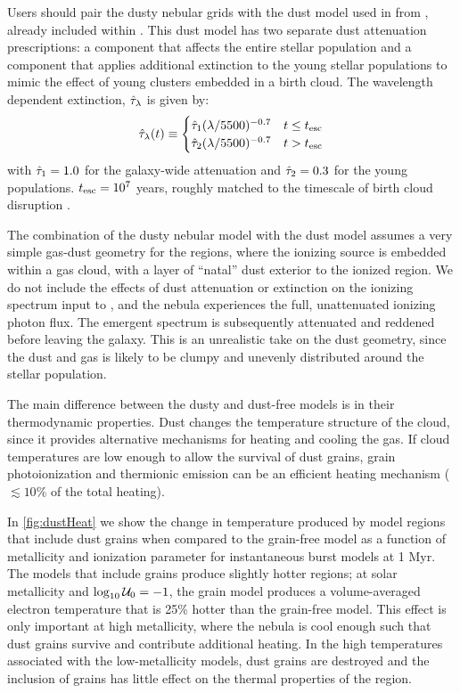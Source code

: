 Users should pair the dusty nebular grids with the dust model used in \citet{Conroy09} from \citet{CharlotFall}, already included within \FSPS. This dust model has two separate dust attenuation prescriptions: a component that affects the entire stellar population and a component that applies additional extinction to the young stellar populations to mimic the effect of young clusters embedded in a birth cloud. The wavelength dependent extinction, $\hat{\tau}_{\mathrm{\lambda}}$ is given by:
\begin{displaymath}\label{eq:dust}
\hat{\tau}_{\mathrm{\lambda}}(t) \equiv \begin{cases}
\hat{\tau}_{\mathrm{1}}(\lambda/5500)^{-0.7} & t \leq t_{\mathrm{esc}} \\
\hat{\tau}_{\mathrm{2}}(\lambda/5500)^{-0.7} & t > t_{\mathrm{esc}}\end{cases}
\end{displaymath}
with $\hat{\tau}_{\mathrm{1}} = 1.0$ for the galaxy-wide attenuation and $\hat{\tau}_{\mathrm{2}} = 0.3$ for the young populations. $t_{\mathrm{esc}} = 10^7$ years, roughly matched to the timescale of birth cloud disruption \citep{Conroy09}.

The combination of the dusty nebular model with the \citet{CharlotFall} dust model assumes a very simple gas-dust geometry for the \hii regions, where the ionizing source is embedded within a gas cloud, with a layer of ``natal'' dust exterior to the ionized region. We do not include the effects of dust attenuation or extinction on the ionizing spectrum input to \Cloudy, and the nebula experiences the full, unattenuated ionizing photon flux. The emergent spectrum is subsequently attenuated and reddened before leaving the galaxy. This is an unrealistic take on the dust geometry, since the dust and gas is likely to be clumpy and unevenly distributed around the stellar population.

The main difference between the dusty and dust-free models is in their thermodynamic properties. Dust changes the temperature structure of the cloud, since it provides alternative mechanisms for heating and cooling the gas. If cloud temperatures are low enough to allow the survival of dust grains, grain photoionization and thermionic emission can be an efficient heating mechanism ($\lesssim10\%$ of the total heating). 

In \ref{fig:dustHeat} we show the change in temperature produced by model \hii regions that include dust grains when compared to the grain-free model as a function of metallicity and ionization parameter for instantaneous burst models at 1 Myr. The models that include grains produce slightly hotter \hii regions; at solar metallicity and $\log_{10} \mathcal{U}_0 = -1$, the grain model produces a volume-averaged electron temperature that is 25\% hotter than the grain-free model. This effect is only important at high metallicity, where the nebula is cool enough such that dust grains survive and contribute additional heating. In the high temperatures associated with the low-metallicity models, dust grains are destroyed and the inclusion of grains has little effect on the thermal properties of the \hii region. 

